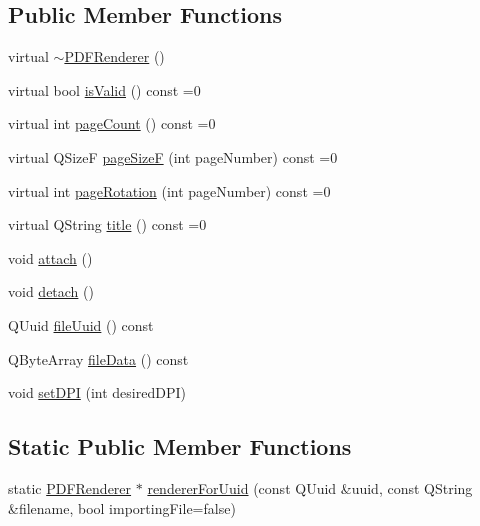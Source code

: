 \subsection*{Public Member Functions}
\begin{DoxyCompactItemize}
\item 
virtual \hyperlink{class_p_d_f_renderer_a2ef00b75cd20961964c1497cc19e43b7}{$\sim$\-P\-D\-F\-Renderer} ()
\item 
virtual bool \hyperlink{class_p_d_f_renderer_acd219d79f7b7235c7562a57708147cf9}{is\-Valid} () const =0
\item 
virtual int \hyperlink{class_p_d_f_renderer_aa952f037d5944d6eb3a06743351be16b}{page\-Count} () const =0
\item 
virtual Q\-Size\-F \hyperlink{class_p_d_f_renderer_a505aa007882410f037a5ae711c535412}{page\-Size\-F} (int page\-Number) const =0
\item 
virtual int \hyperlink{class_p_d_f_renderer_a2e04c1447992028916c8f5764493aa77}{page\-Rotation} (int page\-Number) const =0
\item 
virtual Q\-String \hyperlink{class_p_d_f_renderer_a9e455189ab34238ccc84f42db288ca70}{title} () const =0
\item 
void \hyperlink{class_p_d_f_renderer_a47d8a4732672cce6c9d91527ebca6a9f}{attach} ()
\item 
void \hyperlink{class_p_d_f_renderer_a34c44ce3e92bcd62a97a0d68de320de6}{detach} ()
\item 
Q\-Uuid \hyperlink{class_p_d_f_renderer_a2d5f4c9eda279d52f8883059424520eb}{file\-Uuid} () const 
\item 
Q\-Byte\-Array \hyperlink{class_p_d_f_renderer_a78c222edf79ae2a741b8c3e5c3c1cb1b}{file\-Data} () const 
\item 
void \hyperlink{class_p_d_f_renderer_a12aa241d086852e8617c89cddaef3585}{set\-D\-P\-I} (int desired\-D\-P\-I)
\end{DoxyCompactItemize}
\subsection*{Static Public Member Functions}
\begin{DoxyCompactItemize}
\item 
static \hyperlink{class_p_d_f_renderer}{P\-D\-F\-Renderer} $\ast$ \hyperlink{class_p_d_f_renderer_aa787e1e22efa35f5d7bde2f85093c992}{renderer\-For\-Uuid} (const Q\-Uuid \&uuid, const Q\-String \&filename, bool importing\-File=false)
\end{DoxyCompactItemize}
